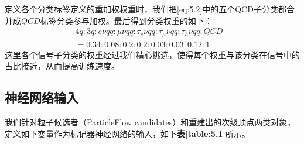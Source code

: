 定义各个分类标签定义的重加权权重时，我们把\eqref{eq:5.2}中的五个QCD子分类都合并成$QCD$标签分类参与加权。最后得到分类权重的如下：
\begin{equation}
\begin{split}
    4q:3q:e\nu qq:\mu\nu qq:\tau_e\nu qq:\tau_\mu\nu qq:\tau_h\nu qq:QCD \\
    =0.34:0.08:0.2:0.2:0.03:0.03:0.12:1 &
\end{split}
\end{equation}
这里各个信号子分类的权重经过我们精心挑选，使得每个权重与该分类在信号中的占比接近，从而提高训练速度。

\subsection{神经网络输入}
我们针对粒子候选者（ParticleFlow candidates）和重建出的次级顶点两类对象，定义如下变量作为标记器神经网络的输入，如下\textbf{表\ref{table:5.1}}所示。
